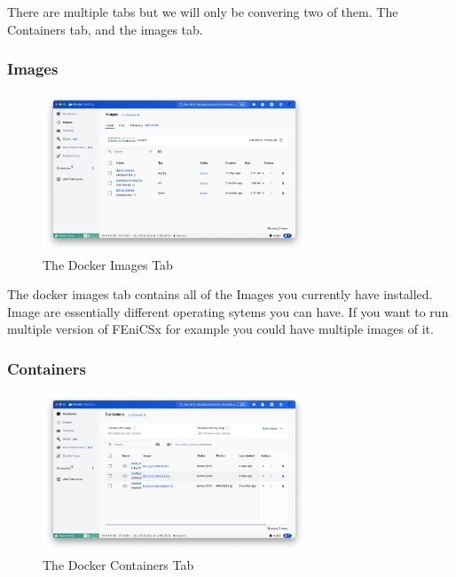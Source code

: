 \documentclass[final]{article}
\numberwithin{equation}{section}
\theoremstyle{remarkStyle}
\begin{document}
There are multiple tabs but we will only be convering two of them. The Containers tab, and the images tab.

\subsubsection{Images}



\begin{figure}[H]
  \centering
  \includegraphics[width=0.7\textwidth]{DockerImages.png}
  \caption{ The Docker Images Tab}%
  \label{fig:docker_Images}%
\end{figure}

The docker images tab contains all of the Images you currently have installed. Image are essentially different operating sytems you can have. If you want to run multiple version of FEniCSx for example you could have multiple images of it.




\subsubsection{Containers}



\begin{figure}[H]
  \centering
  \includegraphics[width=0.7\textwidth]{DockerContainersTab.png}
  \caption{ The Docker Containers Tab}%
  \label{fig:docker_containers}%
\end{figure}
\end{document}
